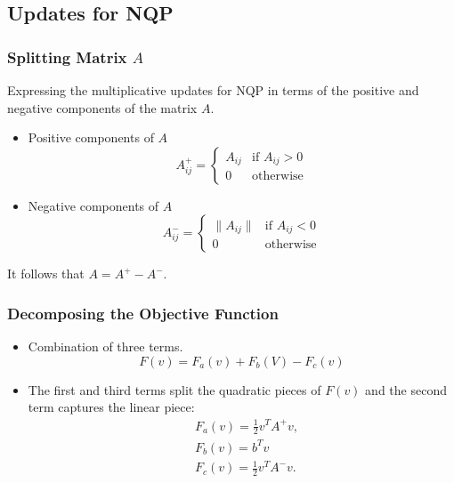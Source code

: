 \documentclass{beamer}
\begin{document}
\subsection{Updates for NQP}
\begin{frame}\frametitle{Splitting Matrix $A$}
Expressing the multiplicative updates for NQP in terms of the positive and negative components of the matrix $A$.
\begin{itemize}
\item Positive components of $A$
\begin{equation}
A_{ij}^+ = \left\{ \begin{array}{ll}
A_{ij} & \textrm{if $A_{ij}>0$}\\
0 & \textrm{otherwise}
\end{array} \right.
\end{equation}
\item Negative components of $A$
\begin{equation}
A_{ij}^- = \left\{ \begin{array}{ll}
\|A_{ij}\| & \textrm{if $A_{ij}<0$}\\
0 & \textrm{otherwise}
\end{array} \right.
\end{equation}
\end{itemize}
It follows that $A=A^+-A^-$.
\end{frame}


\begin{frame}\frametitle{Decomposing the Objective Function}
\begin{itemize}
\item Combination of three terms.
\begin{equation}\label{eq2}
F(v)=F_a(v)+F_b(V)-F_c(v)
\end{equation}
\item The first and third terms split the quadratic pieces of $F(v)$ and the second term captures the linear piece:
\begin{equation}\label{eq3}
\begin{split}
&F_a(v)=\frac{1}{2}v^TA^+v,\\
&F_b(v)=b^Tv\,\\
&F_c(v)=\frac{1}{2}v^TA^-v.
\end{split}
\end{equation}
\end{itemize}
\end{frame}
\end{document}
